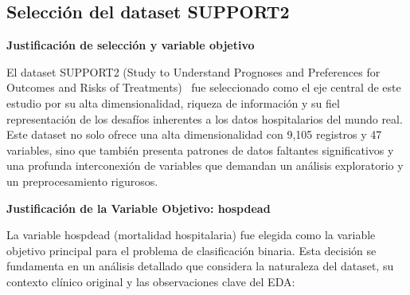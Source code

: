 \subsection{Selección del dataset SUPPORT2}

\textbf{Justificación de selección y variable objetivo}

El dataset SUPPORT2 (Study to Understand Prognoses and Preferences for Outcomes
and Risks of Treatments)~\citep{knaus_support2} fue seleccionado como el eje central de este estudio
por su alta dimensionalidad, riqueza de información y su fiel representación
de los desafíos inherentes a los datos hospitalarios del mundo real. Este
dataset no solo ofrece una alta dimensionalidad con 9,105 registros y 47
variables, sino que también presenta patrones de datos faltantes significativos
y una profunda interconexión de variables que demandan un análisis exploratorio
y un preprocesamiento rigurosos.

\textbf{Justificación de la Variable Objetivo: hospdead}

La variable hospdead (mortalidad hospitalaria) fue elegida como la variable
objetivo principal para el problema de clasificación binaria. Esta decisión se
fundamenta en un análisis detallado que considera la naturaleza del
dataset, su contexto clínico original y las observaciones clave del EDA:

